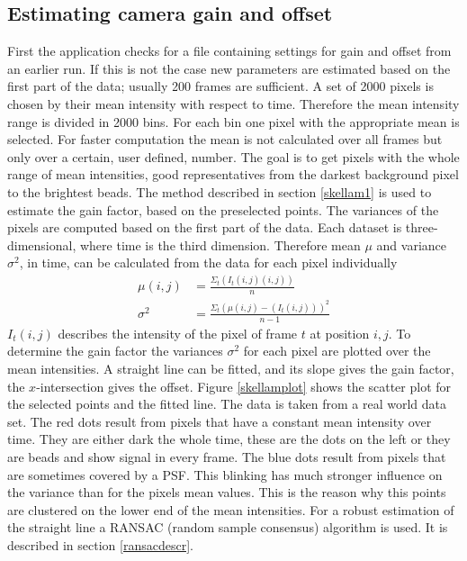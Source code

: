 \subsection{Estimating camera gain and offset}
First the application checks for a file containing settings for gain and offset from an earlier run. If this is not the case new parameters are estimated based on the first part of the data; usually 200 frames are sufficient.\newline
A set of 2000 pixels is chosen by their mean intensity with respect to time. Therefore the mean intensity range is divided in 2000 bins. For each bin one pixel with the appropriate mean is selected. For faster computation the mean is not calculated over all frames but only over a certain, user defined, number. The goal is to get pixels with the whole range of mean intensities, good representatives from the darkest background pixel to the brightest beads.\newline 
The method described in section \ref{skellam1} is used to estimate the gain factor, based on the preselected points. The variances of the pixels are computed based on the first part of the data.
Each dataset is three-dimensional, where time is the third
dimension. Therefore mean $\mu$ and variance $\sigma^2$, in time, can be calculated from
the data for each pixel individually
\begin{align}
	\mu(i,j) & = \frac{\Sigma_t(I_t(i,j)(i,j))}{n}\\
	\sigma^2 & = \frac{\Sigma_t(\mu(i,j)-(I_t(i,j)))^2}{n-1}
\end{align} 
$I_t(i,j)$ describes the intensity of the pixel of frame $t$ at position $i,j$.
To determine the gain factor the variances $\sigma^2$ for each pixel are plotted over the mean
intensities. A straight line can be fitted, and its slope gives the gain
factor, the $x$-intersection gives the offset.\newline 
Figure \ref{skellamplot} shows the scatter plot for the selected points and the fitted line. The data is taken from a real world data set. The red dots result from pixels that have a constant mean intensity over time. They are either dark the whole time, these are the dots on the left or they are beads and show signal in every frame. The blue dots result from pixels that are sometimes covered by a PSF. This blinking has much stronger influence on the variance than for the pixels mean values. This is the reason why this points are clustered on the lower end of the mean intensities. \newline
For a robust estimation of the straight line a RANSAC (random sample consensus) algorithm is used. It is described in section \ref{ransacdescr}. 

